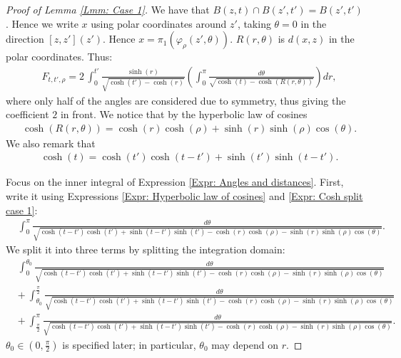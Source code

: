 \documentclass[11pt,twoside,reqno]{amsart} \usepackage{a4wide} \usepackage[T1]{fontenc} \usepackage[utf8]{inputenc} \usepackage{soul}  \usepackage{amsmath} \usepackage{amsfonts} \usepackage{amssymb} \usepackage{mathtools} \usepackage{amsthm} \usepackage{xcolor} \usepackage{graphicx} \usepackage{hyperref} \usepackage{standalone} \usepackage{esint} \usepackage{comment} \usepackage[left=2.3cm,top=3cm,right=2.3cm]{geometry} \usepackage{bm} \usepackage{svg} \usepackage{float} \numberwithin{equation}{section} \theoremstyle{plain} \newtheorem{thm}{Theorem}[section] \newtheorem{theorem}[thm]{Theorem} \newtheorem*{theorem*}{Theorem}\newtheorem{conj}[thm]{Conjecture} \newtheorem{lemma}[thm]{Lemma} \newtheorem{prop}[thm]{Proposition} \newtheorem{proposition}[thm]{Proposition} \newtheorem{cor}[thm]{Corollary} \newtheorem{question}[thm]{Question} \newtheorem{corollary}[thm]{Corollary} \newtheorem{assumption}[thm]{Assumption} \theoremstyle{definition} \newtheorem{defn}[thm]{Definition} \newtheorem{choice}[thm]{Choice} \newtheorem{definition}[thm]{Definition} \newtheorem{ex}[thm]{Example} \newtheorem{notation}[thm]{Notation} \newtheorem*{ack}{Acknowledgements} \theoremstyle{remark} \newtheorem{remark}[thm]{Remark} \newtheorem{bigremark}[thm]{Remark} \usepackage{xcolor} \newcommand{\red}[1]{ {\color{Red}#1} } \newcommand{\blue}[1]{ {\color{Blue}#1} } \author{Kai Hippi} \address{Aalto University, Espoo, Finland} \email{kai.hippi@aalto.fi}
\begin{document}
\begin{proof}[Proof of Lemma \ref{Lmm: Case 1}]

	We have that $ B( z,t ) \cap B( z', t' ) = B( z', t' ) $. Hence we write $ x $ using polar coordinates around $ z' $, taking $ \theta = 0 $ in the direction $ [z,z']( z' ) $. Hence $ x = \pi_{1}( \varphi_{\rho}( z', \theta ) ) $. $ R( r,\theta ) $ is $ d( x,z ) $ in the polar coordinates. Thus:
	\begin{align}
		&
		\label{Expr: Angles and distances}
		F_{t,t',\rho} = 2 \, \int_{0}^{t'} \frac{ \sinh( r ) }{ \sqrt{ \cosh( t' ) - \cosh( r ) } }  \left( \int_{0}^{\pi}  \frac{d \theta}{ \sqrt{ \cosh( t ) - \cosh( R( r,\theta ) ) } } \right) dr,
	\end{align}
	where only half of the angles are considered due to symmetry, thus giving the coefficient $ 2 $ in front. We notice that by the hyperbolic law of cosines
	\begin{align}
		&
		\label{Expr: Hyperbolic law of cosines}
		\cosh( R( r,\theta ) ) = \cosh( r ) \cosh( \rho ) + \sinh( r ) \sinh( \rho ) \cos( \theta ).
	\end{align}
	We also remark that 
	\begin{align}
		&
		\label{Expr: Cosh split case 1}
		\cosh( t ) = \cosh( t' ) \cosh( t - t' ) + \sinh( t' ) \sinh( t - t' ).
	\end{align}
	

	Focus on the inner integral of Expression \eqref{Expr: Angles and distances}. First, write it using Expressions \eqref{Expr: Hyperbolic law of cosines} and \eqref{Expr: Cosh split case 1}:
	\begin{align*}
		&
		\int_{0}^{ \pi }  \frac{d \theta}{ \sqrt{  \cosh( t-t' ) \cosh( t' ) + \sinh( t - t' ) \sinh( t' ) - \cosh( r ) \cosh( \rho ) - \sinh( r ) \sinh( \rho ) \cos( \theta )  } }.
	\end{align*} 
	We split it into three terms by splitting the integration domain:
	\begin{align}
		&
		\nonumber
		\int_{0}^{ \theta_{0}}  \frac{d \theta}{ \sqrt{  \cosh( t-t' ) \cosh( t' ) + \sinh( t - t' ) \sinh( t' ) - \cosh( r ) \cosh( \rho ) - \sinh( r ) \sinh( \rho ) \cos( \theta )  } }
		\\
		& + \
		\nonumber
		\int_{\theta_0}^{ \frac{\pi}{2} }  \frac{d \theta}{ \sqrt{  \cosh( t-t' ) \cosh( t' ) + \sinh( t - t' ) \sinh( t' ) - \cosh( r ) \cosh( \rho ) - \sinh( r ) \sinh( \rho ) \cos( \theta )  } }
		\\
		& + \
		\label{Expr: Angles split}
		\int_{\frac{\pi}{2}}^{ \pi }  \frac{d \theta}{ \sqrt{  \cosh( t-t' ) \cosh( t' ) + \sinh( t - t' ) \sinh( t' ) - \cosh( r ) \cosh( \rho ) - \sinh( r ) \sinh( \rho ) \cos( \theta )  } }.
	\end{align}
	$ \theta_{0} \in ( 0, \frac{\pi}{2} ) $ is specified later; in particular, $ \theta_{0} $ may depend on $ r $.


\end{proof}
\end{document}
